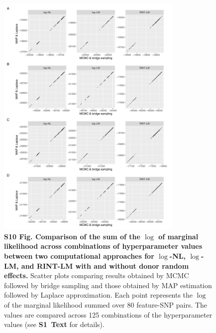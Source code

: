 \documentclass[11pt]{article}
\newcommand{\stext}{\textbf{S1~Text}\xspace}
\begin{document}
\begin{figure}[!ht]
\begin{center}
  \includegraphics[width=0.8\textwidth]{png/sim_compare_sum_lnpy.png}
\end{center}  
\caption{
  {\bf
    S10 Fig.
    Comparison of the sum of the $\log$ of marginal likelihood across combinations of hyperparameter values between two computational approaches for $\log$-NL, $\log$-LM, and RINT-LM with and without donor random effects.}
Scatter plots comparing results obtained by MCMC followed by bridge sampling and those obtained by MAP estimation followed by Laplace approximation. Each point represents the $\log$ of the marginal likelihood summed over 80 feature-SNP pairs.
The values are compared across 125 combinations of the hyperparameter values (see \stext for details).
}
\label{s-fig:sim-compare-sum}
\end{figure}
\end{document}
